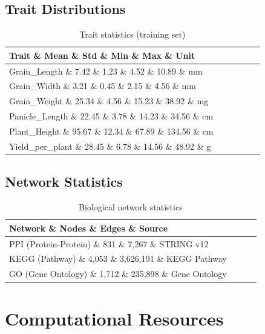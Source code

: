 \documentclass[11pt,a4paper]{article}
\begin{document}
\subsection{Trait Distributions}
\label{subsec:trait_dist}

\begin{table}[H]
\centering
\caption{Trait statistics (training set)}
\label{tab:trait_stats}
\begin{tabular}{lccccc}
\toprule
\textbf{Trait} \& \textbf{Mean} \& \textbf{Std} \& \textbf{Min} \& \textbf{Max} \& \textbf{Unit} \\
\midrule
Grain\_Length \& 7.42 \& 1.23 \& 4.52 \& 10.89 \& mm \\
Grain\_Width \& 3.21 \& 0.45 \& 2.15 \& 4.56 \& mm \\
Grain\_Weight \& 25.34 \& 4.56 \& 15.23 \& 38.92 \& mg \\
Panicle\_Length \& 22.45 \& 3.78 \& 14.23 \& 34.56 \& cm \\
Plant\_Height \& 95.67 \& 12.34 \& 67.89 \& 134.56 \& cm \\
Yield\_per\_plant \& 28.45 \& 6.78 \& 14.56 \& 48.92 \& g \\
\bottomrule
\end{tabular}
\end{table}

\subsection{Network Statistics}
\label{subsec:network_stats}

\begin{table}[H]
\centering
\caption{Biological network statistics}
\label{tab:network_stats}
\begin{tabular}{lccc}
\toprule
\textbf{Network} \& \textbf{Nodes} \& \textbf{Edges} \& \textbf{Source} \\
\midrule
PPI (Protein-Protein) \& 831 \& 7,267 \& STRING v12 \\
KEGG (Pathway) \& 4,053 \& 3,626,191 \& KEGG Pathway \\
GO (Gene Ontology) \& 1,712 \& 235,898 \& Gene Ontology \\
\bottomrule
\end{tabular}
\end{table}

\section{Computational Resources}
\label{sec:computational}
\end{document}
